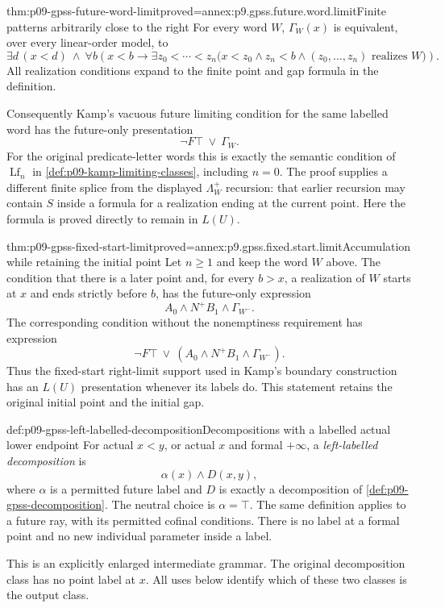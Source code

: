 \begin{hblemma}{thm:p09-gpss-future-word-limit}{proved=annex:p9.gpss.future.word.limit}{Finite patterns arbitrarily close to the right}
For every word \(W\), \(\Gamma_W(x)\) is equivalent, over every
linear-order model, to
\[
 \exists d\,(x<d)\ \land\
 \forall b\left(x<b\to
   \exists z_0<\cdots<z_n
       \bigl(x<z_0\land z_n<b\land
                    (z_0,\ldots,z_n)\text{ realizes }W\bigr)\right).
\]
All realization conditions expand to the finite point and gap formula
in the definition.

Consequently Kamp's vacuous future limiting condition for the same
labelled word has the future-only presentation
\[
                       \neg F\top\ \lor\ \Gamma_W.
\]
For the original predicate-letter words this is exactly the semantic
condition of \(\operatorname{Lf}_n\) in
\cref{def:p09-kamp-limiting-classes}, including \(n=0\).
The proof supplies a different finite splice from the displayed
\(\Lambda_W^+\) recursion: that earlier recursion may contain \(S\)
inside a formula for a realization ending at the current point.
Here the formula is proved directly to remain in \(L(U)\).
\end{hblemma}

\begin{hblemma}{thm:p09-gpss-fixed-start-limit}{proved=annex:p9.gpss.fixed.start.limit}{Accumulation while retaining the initial point}
Let \(n\geq1\) and keep the word \(W\) above. The condition that
there is a later point and, for every \(b>x\), a realization of
\(W\) starts at \(x\) and ends strictly before \(b\), has the
future-only expression
\[
                      A_0\land N^+B_1\land\Gamma_{W^-}.
\]
The corresponding condition without the nonemptiness requirement has
expression
\[
        \neg F\top\ \lor\
                      (A_0\land N^+B_1\land\Gamma_{W^-}).
\]
Thus the fixed-start right-limit support used in Kamp's boundary
construction has an \(L(U)\) presentation whenever its labels do.
This statement retains the original initial point and the initial gap.
\end{hblemma}

\begin{hbdefinition}{def:p09-gpss-left-labelled-decomposition}{Decompositions with a labelled actual lower endpoint}
For actual \(x<y\), or actual \(x\) and formal \(+\infty\),
a \emph{left-labelled decomposition} is
\[
                           \alpha(x)\land D(x,y),
\]
where \(\alpha\) is a permitted future label and \(D\) is exactly a
decomposition of \cref{def:p09-gpss-decomposition}. The neutral
choice is \(\alpha=\top\). The same definition applies to a future
ray, with its permitted cofinal conditions. There is no label at a
formal point and no new individual parameter inside a label.

This is an explicitly enlarged intermediate grammar. The original
decomposition class has no point label at \(x\). All uses below
identify which of these two classes is the output class.
\end{hbdefinition}

